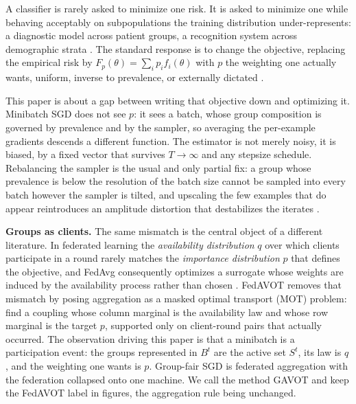 \documentclass{article}
\theoremstyle{definition}
\newcommand{\avot}{\textsf{GAVOT}}
\begin{document}
A classifier is rarely asked to minimize one risk. It is asked to minimize one
while behaving acceptably on subpopulations the training distribution
under-represents: a diagnostic model across patient groups, a recognition system
across demographic strata \cite{buolamwini2018gender,hashimoto2018repeated,%
sagawa2020dro}. The standard response is to change the objective, replacing the
empirical risk by $F_p(\theta)=\sum_i p_i f_i(\theta)$ with $p$ the weighting
one actually wants, uniform, inverse to prevalence, or externally dictated
\cite{mohri2019agnostic,li2020fair}.

This paper is about a gap between writing that objective down and optimizing it.
Minibatch SGD does not see $p$: it sees a batch, whose group composition is
governed by prevalence and by the sampler, so averaging the per-example
gradients descends a different function. The estimator is not merely noisy, it
is biased, by a fixed vector that survives $T\to\infty$ and any stepsize
schedule. Rebalancing the sampler is the usual and only partial fix: a group
whose prevalence is below the resolution of the batch size cannot be sampled
into every batch however the sampler is tilted, and upscaling the few examples
that do appear reintroduces an amplitude distortion that destabilizes the
iterates \cite{rahimi2025fedavot}.

\noindent\textbf{Groups as clients.}
The same mismatch is the central object of a different literature. In federated
learning the \emph{availability distribution} $q$ over which clients participate
in a round rarely matches the \emph{importance distribution} $p$ that defines
the objective, and \textsf{FedAvg} consequently optimizes a surrogate whose
weights are induced by the availability process rather than chosen
\cite{rahimi2025agnostic,wang2020objective,cho2022biased}. \textsf{FedAVOT}
\cite{rahimi2025fedavot} removes that mismatch by posing aggregation as a masked
optimal transport (MOT) problem: find a coupling whose column marginal is the
availability law and whose row marginal is the target $p$, supported only on
client-round pairs that actually occurred. The observation driving this paper is that a minibatch is a participation
event: the groups represented in $B^t$ are the active set $S^t$, its law is $q$,
and the weighting one wants is $p$. Group-fair SGD is federated aggregation with
the federation collapsed onto one machine. We call the method \avot{} and keep
the \textsf{FedAVOT} label in figures, the aggregation rule being unchanged.
\end{document}

